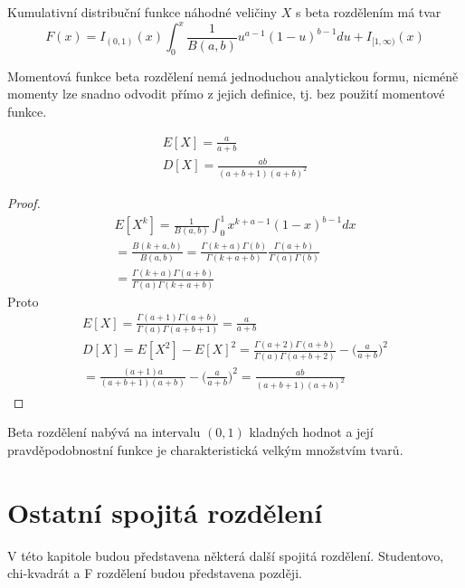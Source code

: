 \begin{theorem}
Kumulativní distribuční funkce náhodné veličiny $X$ s beta rozdělením má tvar
\begin{equation*}
F(x) = I_{(0, 1)}(x) \int_0^x \frac{1}{B(a, b)}u^{a - 1}(1 - u)^{b - 1}du + I_{[1, \infty)}(x)
\end{equation*}
\end{theorem}

Momentová funkce beta rozdělení nemá jednoduchou analytickou formu, nicméně momenty lze snadno odvodit přímo z jejich definice, tj. bez použití momentové funkce.

\begin{theorem}
\begin{gather*}
E[X] = \frac{a}{a + b}\\
D[X] = \frac{ab}{(a + b + 1)(a + b)^2}
\end{gather*}
\end{theorem}
\begin{proof}
\begin{gather*}
E[X^k] = \frac{1}{B(a, b)} \int_0^1 x^{k + a - 1}(1 - x)^{b - 1}dx\\
=\frac{B(k + a, b)}{B(a, b)} = \frac{\Gamma(k + a)\Gamma(b)}{\Gamma(k + a + b)} \frac{\Gamma(a + b)}{\Gamma(a) \Gamma(b)}\\
= \frac{\Gamma(k + a)\Gamma(a + b)}{\Gamma(a) \Gamma(k + a + b)}
\end{gather*}
Proto
\begin{gather*}
E[X] = \frac{\Gamma(a + 1) \Gamma(a + b)}{\Gamma(a) \Gamma(a + b + 1)} = \frac{a}{a + b}\\
D[X] = E[X^2] - E[X]^2 = \frac{\Gamma(a + 2)\Gamma(a + b)}{\Gamma(a) \Gamma(a + b + 2)} - \Big(\frac{a}{a + b}\Big)^2\\
= \frac{(a + 1)a}{(a + b + 1)(a + b)} - \Big(\frac{a}{a + b}\Big)^2 = \frac{ab}{(a + b + 1)(a + b)^2}
\end{gather*}
\end{proof}

Beta rozdělení nabývá na intervalu $(0, 1)$ kladných hodnot a její pravděpodobnostní funkce je charakteristická velkým množstvím tvarů.

\section{Ostatní spojitá rozdělení}

V této kapitole budou představena některá další spojitá rozdělení. Studentovo, chi-kvadrát a F rozdělení budou představena později.


